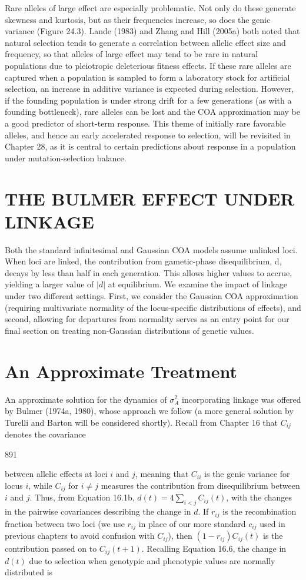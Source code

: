 \documentclass{article}
\begin{document}
Rare alleles of large effect are especially problematic. Not only do these generate skewness and kurtosis, but as their frequencies increase, so does the genic variance (Figure 24.3). Lande (1983) and Zhang and Hill (2005a) both noted that natural selection tends to generate a correlation between allelic effect size and frequency, so that alleles of large effect may tend to be rare in natural populations due to pleiotropic deleterious fitness effects. If these rare alleles are captured when a population is sampled to form a laboratory stock for artificial selection, an increase in additive variance is expected during selection. However, if the founding population is under strong drift for a few generations (as with a founding bottleneck), rare alleles can be lost and the COA approximation may be a good predictor of short-term response. This theme of initially rare favorable alleles, and hence an early accelerated response to selection, will be revisited in Chapter 28, as it is central to certain predictions about response in a population under mutation-selection balance.

\section{THE BULMER EFFECT UNDER LINKAGE}
Both the standard infinitesimal and Gaussian COA models assume unlinked loci. When loci are linked, the contribution from gametic-phase disequilibrium, d, decays by less than half in each generation. This allows higher values to accrue, yielding a larger value of  $ |d| $ at equilibrium. We examine the impact of linkage under two different settings. First, we consider the Gaussian COA approximation (requiring multivariate normality of the locus-specific distributions of effects), and second, allowing for departures from normality serves as an entry point for our final section on treating non-Gaussian distributions of genetic values.

\section{An Approximate Treatment}
An approximate solution for the dynamics of  $ \sigma_{A}^{2} $ incorporating linkage was offered by Bulmer (1974a, 1980), whose approach we follow (a more general solution by Turelli and Barton will be considered shortly). Recall from Chapter 16 that  $ C_{ij} $ denotes the covariance

891

between allelic effects at loci $i$ and $j$, meaning that $C_{ii}$ is the genic variance for locus $i$, while $C_{ij}$ for $i \neq j$ measures the contribution from disequilibrium between $i$ and $j$. Thus, from Equation 16.1b, $d(t) = 4 \sum_{i < j} C_{ij}(t)$, with the changes in the pairwise covariances describing the change in $d$. If $r_{ij}$ is the recombination fraction between two loci (we use $r_{ij}$ in place of our more standard $c_{ij}$ used in previous chapters to avoid confusion with $C_{ij}$), then $(1 - r_{ij}) C_{ij}(t)$ is the contribution passed on to $C_{ij}(t + 1)$. Recalling Equation 16.6, the change in $d(t)$ due to selection when genotypic and phenotypic values are normally distributed is
\end{document}
